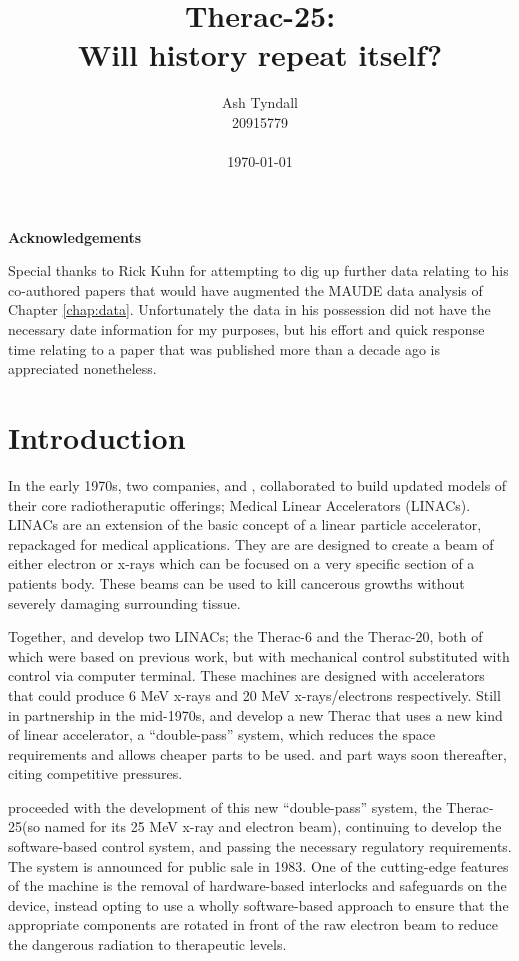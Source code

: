 \documentclass{cshonours}
\title{Therac-25:\\Will history repeat itself?}
\author{Ash Tyndall\\20915779\\\\{\smaller\today}}
\newcommand{\ther}{Therac-25\xspace}
\begin{document}
\maketitle

\tableofcontents

\vfill

{\larger \noindent \textbf{Acknowledgements}}

\noindent Special thanks to Rick Kuhn for attempting to dig up further data relating to his co-authored papers \cite{wallace1999lessons,wallace2001failure} that would have augmented the MAUDE data analysis of Chapter \ref{chap:data}. Unfortunately the data in his possession did not have the necessary date information for my purposes, but his effort and quick response time relating to a paper that was published more than a decade ago is appreciated nonetheless.

\chapter{Introduction}

In the early 1970s, two companies, \aecl and \cgr, collaborated to build updated models of their core radiotheraputic offerings; Medical Linear Accelerators (LINACs). LINACs are an extension of the basic concept of a linear particle accelerator, repackaged for medical applications. They are are designed to create a beam of either electron or x-rays which can be focused on a very specific section of a patients body. These beams can be used to kill cancerous growths without severely damaging surrounding tissue.

Together, \aecl and \cgr develop two LINACs; the Therac-6 and the Therac-20, both of which were based on previous \cgr work, but with mechanical control substituted with control via computer terminal. These machines are designed with accelerators that could produce 6 MeV x-rays and 20 MeV x-rays/electrons respectively. Still in partnership in the mid-1970s, \aecl and \cgr develop a new Therac that uses a new kind of linear accelerator, a ``double-pass'' system, which reduces the space requirements and allows cheaper parts to be used. \aecl and \cgr part ways soon thereafter, citing competitive pressures. 

\aecl proceeded with the development of this new ``double-pass'' system, the \ther (so named for its 25 MeV x-ray and electron beam), continuing to develop the software-based control system, and passing the necessary regulatory requirements. The system is announced for public sale in 1983. One of the cutting-edge features of the machine is the removal of hardware-based interlocks and safeguards on the device, \aecl instead opting to use a wholly software-based approach to ensure that the appropriate components are rotated in front of the raw electron beam to reduce the dangerous radiation to therapeutic levels.
\end{document}
